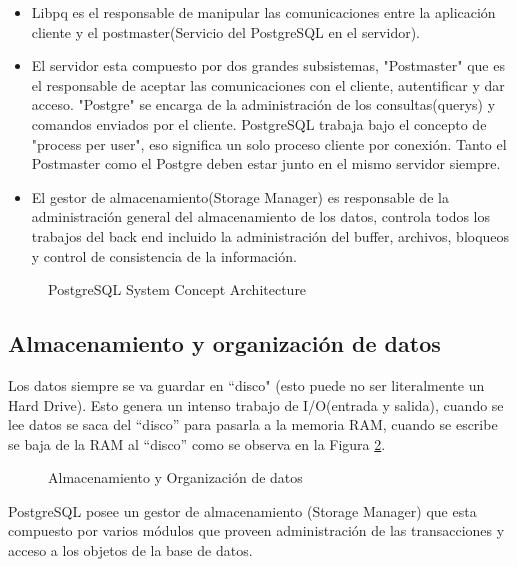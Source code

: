 \begin{itemize}
\item Libpq es el responsable de manipular las comunicaciones entre la aplicaci\'on cliente y el postmaster(Servicio del PostgreSQL en el servidor).
\item El servidor esta compuesto por dos grandes subsistemas, "Postmaster" que es el responsable de aceptar las comunicaciones con el cliente, autentificar y dar acceso. "Postgre" se encarga de la administraci\'on de los consultas(querys) y comandos enviados por el cliente. PostgreSQL trabaja bajo el concepto de "process per user", eso significa un solo proceso cliente por conexi\'on. Tanto el Postmaster como el Postgre deben estar junto en el mismo servidor siempre.
\item El gestor de almacenamiento(Storage Manager) es responsable de la administraci\'on general del almacenamiento de los datos, controla todos los trabajos del back end incluido la administraci\'on del buffer, archivos, bloqueos y control de consistencia de la informaci\'on.   
\end{itemize}
\begin{figure}[H]
\centering
{}
\caption{PostgreSQL System Concept Architecture \cite{postgresqlpordentro}} \label{fig:ArquitecturaPostgres}
\end{figure}
\subsection{Almacenamiento y organizaci\'on de datos}
Los datos siempre se va guardar en ``disco" (esto puede no ser literalmente un Hard Drive).
Esto genera un intenso trabajo de I/O(entrada y salida), cuando se lee datos se saca del ``disco'' para pasarla a la memoria RAM, cuando se escribe se baja  de la RAM al ``disco'' como se observa en la Figura \ref{fig:almacenamientoorganizaciondatos}.
\begin{figure}[H]
\centering
{}
\caption{Almacenamiento y Organizaci\'on de datos \cite{postgresqlpordentro}} \label{fig:almacenamientoorganizaciondatos}
\end{figure}
PostgreSQL posee un gestor de almacenamiento (Storage Manager) que esta compuesto por varios m\'odulos que proveen administraci\'on de las transacciones y acceso a los objetos de la base de datos.

